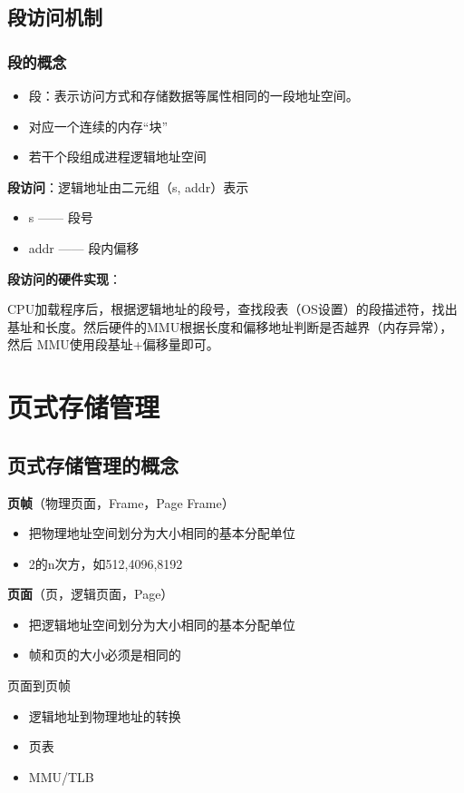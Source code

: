 \subsection{段访问机制}
\subsubsection*{段的概念}
\begin{itemize}
	\item 段：表示访问方式和存储数据等属性相同的一段地址空间。
	\item 对应一个连续的内存“块”
	\item 若干个段组成进程逻辑地址空间
\end{itemize}
\textbf{段访问}：逻辑地址由二元组（s, addr）表示
\begin{itemize}
	\item s —— 段号
	\item addr —— 段内偏移
\end{itemize}
\textbf{段访问的硬件实现}：\par 
CPU加载程序后，根据逻辑地址的段号，查找段表（OS设置）的段描述符，找出基址和长度。然后硬件的MMU根据长度和偏移地址判断是否越界（内存异常），然后
MMU使用段基址+偏移量即可。

\section{页式存储管理}
\subsection{页式存储管理的概念}
\noindent\textbf{页帧}（物理页面，Frame，Page Frame）
\begin{itemize}
	\item 把物理地址空间划分为大小相同的基本分配单位
	\item 2的n次方，如512,4096,8192
\end{itemize}
\textbf{页面}（页，逻辑页面，Page）
\begin{itemize}
	\item 把逻辑地址空间划分为大小相同的基本分配单位
	\item 帧和页的大小必须是相同的
\end{itemize}
页面到页帧
\begin{itemize}
	\item 逻辑地址到物理地址的转换
	\item 页表
	\item MMU/TLB
\end{itemize}
